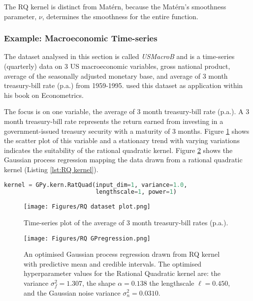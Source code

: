 \documentclass[12pt,a4paper]{article}
\begin{document}
The RQ kernel is distinct from Mat\'{e}rn, because the Mat\'{e}rn's smoothness parameter, \(\nu\), determines the smoothness for the entire function. 

\subsubsection{Example: Macroeconomic Time-series}
\label{sec:RQ example}

The dataset analysed in this section is called \textit{USMacroB} and is a time-series (quarterly) data on 3 US macroeconomic variables, gross national product, average of the seasonally adjusted monetary base, and average of 3 month treasury-bill rate (p.a.) from 1959-1995. \citet{baltagi2008econometric} used this dataset as application within his book on Econometrics. 

The focus is on one variable, the average of 3 month treasury-bill rate (p.a.). A 3 month treasury-bill rate represents the return earned from investing in a government-issued treasury security with a maturity of 3 months. Figure \ref{fig:RQ dataset plot} shows the scatter plot of this variable and a stationary trend with varying variations indicates the suitability of the rational quadratic kernel. Figure \ref{fig:RQ GPregression} shows the Gaussian process regression mapping the data drawn from a rational quadratic kernel (Listing \ref{lst:RQ kernel}).

\vspace{10pt}
\begin{lstlisting}[language=python, caption={Code of creating the rational quadratic kernel.}, label={lst:RQ kernel}]
kernel = GPy.kern.RatQuad(input_dim=1, variance=1.0,        
                          lengthscale=1, power=1)
\end{lstlisting}

\begin{figure}[h]
\centering
\texttt{[image: Figures/RQ dataset plot.png]} 
\caption{Time-series plot of the average of 3 month treasury-bill rates (p.a.).} \label{fig:RQ dataset plot}
\end{figure}

\begin{figure}[h]
\centering
\texttt{[image: Figures/RQ GPregression.png]} 
\caption{An optimised Gaussian process regression drawn from RQ kernel with predictive mean and credible intervals. The optimised hyperparameter values for the Rational Quadratic kernel are: the variance \(\sigma_f^2 = 1.307\), the shape \(\alpha = 0.138\) the lengthscale \(\ell = 0.450\), and the Gaussian noise variance \(\sigma_n^2 = 0.0310\).} \label{fig:RQ GPregression}
\end{figure}
\end{document}
